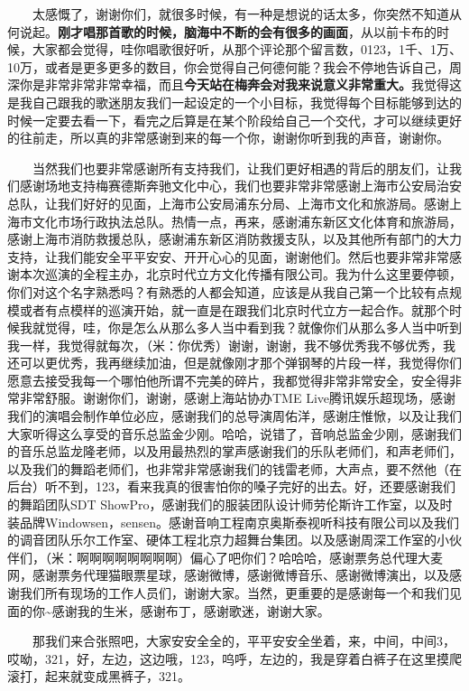 \documentclass[]{ctexbook}
\begin{document}
  太感慨了，谢谢你们，就很多时候，有一种是想说的话太多，你突然不知道从何说起。\textbf{刚才唱那首歌的时候，脑海中不断的会有很多的画面}，从以前卡布的时候，大家都会觉得，哇你唱歌很好听，从那个评论那个留言数，0123，1千、1万、10万，或者是更多更多的数目，你会觉得自己何德何能？我会不停地告诉自己，周深你是非常非常非常幸福，而且\textbf{今天站在梅奔会对我来说意义非常重大。}我觉得这是我自己跟我的歌迷朋友我们一起设定的一个小目标，我觉得每个目标能够到达的时候一定要去看一下，看完之后算是在某个阶段给自己一个交代，才可以继续更好的往前走，所以真的非常感谢到来的每一个你，谢谢你听到我的声音，谢谢你。

  当然我们也要非常感谢所有支持我们，让我们更好相遇的背后的朋友们，让我们感谢场地支持梅赛德斯奔驰文化中心，我们也要非常非常感谢上海市公安局治安总队，让我们好好的见面，上海市公安局浦东分局、上海市文化和旅游局。感谢上海市文化市场行政执法总队。热情一点，再来，感谢浦东新区文化体育和旅游局，感谢上海市消防救援总队，感谢浦东新区消防救援支队，以及其他所有部门的大力支持，让我们能安全平平安安、开开心心的见面，谢谢他们。然后也要非常非常感谢本次巡演的全程主办，北京时代立方文化传播有限公司。我为什么这里要停顿，你们对这个名字熟悉吗？有熟悉的人都会知道，应该是从我自己第一个比较有点规模或者有点模样的巡演开始，就一直是在跟我们北京时代立方一起合作。就那个时候我就觉得，哇，你是怎么从那么多人当中看到我？就像你们从那么多人当中听到我一样，我觉得就每次，（米：你优秀）谢谢，谢谢，我不够优秀我不够优秀，我还可以更优秀，我再继续加油，但是就像刚才那个弹钢琴的片段一样，我觉得你们愿意去接受我每一个哪怕他所谓不完美的碎片，我都觉得非常非常安全，安全得非常非常舒服。谢谢你们，谢谢，感谢上海站协办TME Live腾讯娱乐超现场，感谢我们的演唱会制作单位必应，感谢我们的总导演周佑洋，感谢庄惟惞，以及让我们大家听得这么享受的音乐总监金少刚。哈哈，说错了，音响总监金少刚，感谢我们的音乐总监龙隆老师，以及用最热烈的掌声感谢我们的乐队老师们，和声老师们，以及我们的舞蹈老师们，也非常非常感谢我们的钱雷老师，大声点，要不然他（在后台）听不到，123，看来我真的很害怕你的嗓子完好的出去。好，还要感谢我们的舞蹈团队SDT ShowPro，感谢我们的服装团队设计师劳伦斯许工作室，以及时装品牌Windowsen，sensen。感谢音响工程南京奥斯泰视听科技有限公司以及我们的调音团队乐尔工作室、硬体工程北京力超舞台集团。以及感谢周深工作室的小伙伴们，（米：啊啊啊啊啊啊啊啊）偏心了吧你们？哈哈哈，感谢票务总代理大麦网，感谢票务代理猫眼票星球，感谢微博，感谢微博音乐、感谢微博演出，以及感谢我们所有现场的工作人员们，谢谢大家。当然，更重要的是感谢每一个和我们见面的你\textasciitilde 感谢我的生米，感谢布丁，感谢歌迷，谢谢大家。

  那我们来合张照吧，大家安安全全的，平平安安全坐着，来，中间，中间3，哎呦，321，好，左边，这边哦，123，呜呼，左边的，我是穿着白裤子在这里摸爬滚打，起来就变成黑裤子，321。
\end{document}
